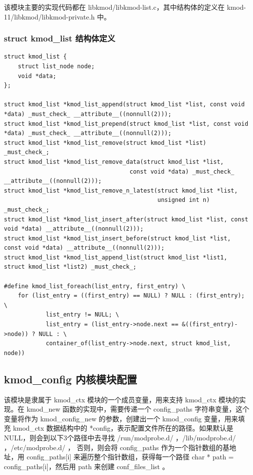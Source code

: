 该模块主要的实现代码都在 libkmod/libkmod-list.c，其中结构体的定义在
kmod-11/libkmod/libkmod-private.h 中。

\subsubsection{struct kmod\_list 结构体定义}

{\begin{shaded}\begin{verbatim}
struct kmod_list {
    struct list_node node;
    void *data;
};

struct kmod_list *kmod_list_append(struct kmod_list *list, const void *data) _must_check_ __attribute__((nonnull(2)));
struct kmod_list *kmod_list_prepend(struct kmod_list *list, const void *data) _must_check_ __attribute__((nonnull(2)));
struct kmod_list *kmod_list_remove(struct kmod_list *list) _must_check_;
struct kmod_list *kmod_list_remove_data(struct kmod_list *list,
                                    const void *data) _must_check_ __attribute__((nonnull(2)));
struct kmod_list *kmod_list_remove_n_latest(struct kmod_list *list,
                                            unsigned int n) _must_check_;
struct kmod_list *kmod_list_insert_after(struct kmod_list *list, const void *data) __attribute__((nonnull(2)));
struct kmod_list *kmod_list_insert_before(struct kmod_list *list, const void *data) __attribute__((nonnull(2)));
struct kmod_list *kmod_list_append_list(struct kmod_list *list1, struct kmod_list *list2) _must_check_;

#define kmod_list_foreach(list_entry, first_entry) \
    for (list_entry = ((first_entry) == NULL) ? NULL : (first_entry); \
            list_entry != NULL; \
            list_entry = (list_entry->node.next == &((first_entry)->node)) ? NULL : \
            container_of(list_entry->node.next, struct kmod_list, node))
\end{verbatim}\end{shaded}}
\subsection{kmod\_config 内核模块配置}

该模块是隶属于 kmod\_ctx 模块的一个成员变量，用来支持 kmod\_ctx
模块的实现。在 kmod\_new 函数的实现中，需要传递一个 config\_paths
字符串变量，这个变量将作为 kmod\_config\_new 的参数，创建出一个
kmod\_config 变量，用来填充 kmod\_ctx 数据结构中的
*config，表示配置文件所在的路径。如果默认是NULL，则会到以下3个路径中去寻找
/run/modprobe.d/ ，/lib/modprobe.d/ ，/etc/modprobe.d/ ， 否则，则会将
config\_paths 作为一个指针数组的基地址，用 config\_paths{[}i{]}
来遍历整个指针数组，获得每一个路径 char * path =
config\_paths{[}i{]}，然后用 path 来创建 conf\_files\_list 。


